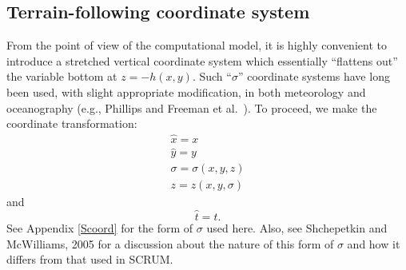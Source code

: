 \subsection{Terrain-following coordinate system}
From the point of view of the computational model, it is highly
convenient to introduce a stretched vertical coordinate system which
essentially ``flattens out'' the variable bottom at $z = -h(x,y)$.
Such ``$\sigma$'' coordinate systems have long been used, with slight
appropriate modification, in both meteorology and oceanography
(e.g., Phillips \cite{Phil} and Freeman et al.\ \cite{FHD}).
To proceed, we make the coordinate transformation:
\[\begin{array}{c}
  \hat{x} = x \\
  \hat{y} = y \\[1mm]
  \sigma = \sigma(x,y,z) \\[1mm]
  z = z(x,y,\sigma)
\end{array}\]
and
\[
  \hat{t} = t.
\]
See Appendix \ref{Scoord} for the form of $\sigma$ used here.
Also, see Shchepetkin and McWilliams, 2005 \cite{SS2005} for a
discussion about the nature of this form of $\sigma$ and how it
differs from that used in SCRUM.

